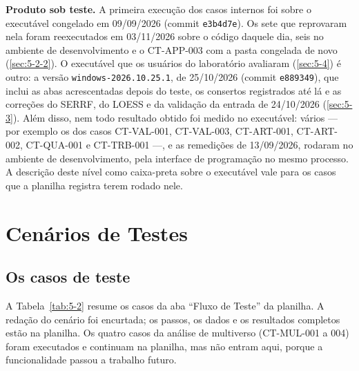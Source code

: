 \textbf{Produto sob teste.} A primeira execução dos casos internos foi sobre o executável congelado em 09/09/2026 (commit \texttt{e3b4d7e}). Os sete que reprovaram nela foram reexecutados em 03/11/2026 sobre o código daquele dia, seis no ambiente de desenvolvimento e o CT-APP-003 com a pasta congelada de novo (\ref{sec:5-2-2}). O executável que os usuários do laboratório avaliaram (\ref{sec:5-4}) é outro: a versão \texttt{windows-\allowbreak{}2026.\allowbreak{}10.\allowbreak{}25.\allowbreak{}1}, de 25/10/2026 (commit \texttt{e889349}), que inclui as abas acrescentadas depois do teste, os consertos registrados até lá e as correções do SERRF, do LOESS e da validação da entrada de 24/10/2026 (\ref{sec:5-3}). Além disso, nem todo resultado obtido foi medido no executável: vários --- por exemplo os dos casos CT-VAL-001, CT-VAL-003, CT-ART-001, CT-ART-002, CT-QUA-001 e CT-TRB-001 ---, e as remedições de 13/09/2026, rodaram no ambiente de desenvolvimento, pela interface de programação no mesmo processo. A descrição deste nível como caixa-preta sobre o executável vale para os casos que a planilha registra terem rodado nele.


\section{Cenários de Testes}\label{sec:5-2}

\subsection{Os casos de teste}\label{sec:5-2-1}

A Tabela~\ref{tab:5-2} resume os casos da aba ``Fluxo de Teste'' da planilha. A redação do cenário foi encurtada; os passos, os dados e os resultados completos estão na planilha. Os quatro casos da análise de multiverso (CT-MUL-001 a 004) foram executados e continuam na planilha, mas não entram aqui, porque a funcionalidade passou a trabalho futuro.


